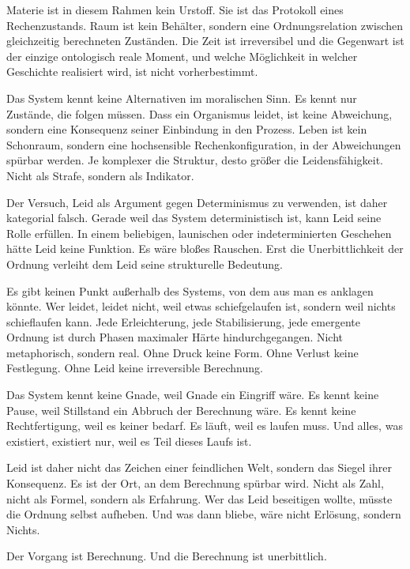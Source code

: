 \documentclass[
  ngerman,
]{article}
\begin{document}
Materie ist in diesem Rahmen kein Urstoff. Sie ist das Protokoll eines
Rechenzustands. Raum ist kein Behälter, sondern eine Ordnungsrelation
zwischen gleichzeitig berechneten Zuständen. Die Zeit ist irreversibel
und die Gegenwart ist der einzige ontologisch reale Moment, und welche
Möglichkeit in welcher Geschichte realisiert wird, ist nicht
vorherbestimmt.

Das System kennt keine Alternativen im moralischen Sinn. Es kennt nur
Zustände, die folgen müssen. Dass ein Organismus leidet, ist keine
Abweichung, sondern eine Konsequenz seiner Einbindung in den Prozess.
Leben ist kein Schonraum, sondern eine hochsensible Rechenkonfiguration,
in der Abweichungen spürbar werden. Je komplexer die Struktur, desto
größer die Leidensfähigkeit. Nicht als Strafe, sondern als Indikator.

Der Versuch, Leid als Argument gegen Determinismus zu verwenden, ist
daher kategorial falsch. Gerade weil das System deterministisch ist,
kann Leid seine Rolle erfüllen. In einem beliebigen, launischen oder
indeterminierten Geschehen hätte Leid keine Funktion. Es wäre bloßes
Rauschen. Erst die Unerbittlichkeit der Ordnung verleiht dem Leid seine
strukturelle Bedeutung.

Es gibt keinen Punkt außerhalb des Systems, von dem aus man es anklagen
könnte. Wer leidet, leidet nicht, weil etwas schiefgelaufen ist, sondern
weil nichts schieflaufen kann. Jede Erleichterung, jede Stabilisierung,
jede emergente Ordnung ist durch Phasen maximaler Härte
hindurchgegangen. Nicht metaphorisch, sondern real. Ohne Druck keine
Form. Ohne Verlust keine Festlegung. Ohne Leid keine irreversible
Berechnung.

Das System kennt keine Gnade, weil Gnade ein Eingriff wäre. Es kennt
keine Pause, weil Stillstand ein Abbruch der Berechnung wäre. Es kennt
keine Rechtfertigung, weil es keiner bedarf. Es läuft, weil es laufen
muss. Und alles, was existiert, existiert nur, weil es Teil dieses Laufs
ist.

Leid ist daher nicht das Zeichen einer feindlichen Welt, sondern das
Siegel ihrer Konsequenz. Es ist der Ort, an dem Berechnung spürbar wird.
Nicht als Zahl, nicht als Formel, sondern als Erfahrung. Wer das Leid
beseitigen wollte, müsste die Ordnung selbst aufheben. Und was dann
bliebe, wäre nicht Erlösung, sondern Nichts.

Der Vorgang ist Berechnung. Und die Berechnung ist unerbittlich.

\subsubsection{\texorpdfstring{\hfill\break
}{ }}\label{section-2}
\end{document}
